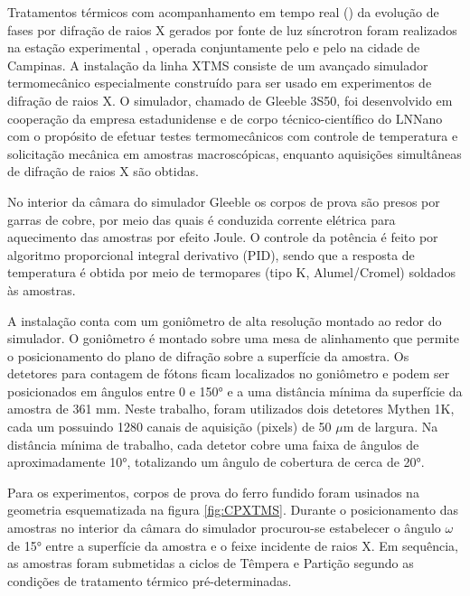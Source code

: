 Tratamentos térmicos com acompanhamento em tempo real () da evolução de fases por difração de raios X gerados por fonte de luz síncrotron foram realizados na estação experimental , operada conjuntamente pelo   e pelo  na cidade de Campinas. A instalação da linha XTMS consiste de um avançado simulador termomecânico especialmente construído para ser usado em experimentos de difração de raios X. O simulador, chamado de Gleeble\textregistered{} 3S50, foi desenvolvido em cooperação da empresa estadunidense  e de corpo técnico-científico do LNNano com o propósito de efetuar testes termomecânicos com controle de temperatura e solicitação mecânica em amostras macroscópicas, enquanto aquisições simultâneas de difração de raios X são obtidas. %

No interior da câmara do simulador Gleeble os corpos de prova são presos por garras de cobre, por meio das quais é conduzida corrente elétrica para aquecimento das amostras por efeito Joule. O controle da potência é feito por algoritmo proporcional integral derivativo (PID), sendo que a resposta de temperatura é obtida por meio de termopares (tipo K, Alumel/Cromel) soldados às amostras.

A instalação conta com um goniômetro de alta resolução montado ao redor do simulador. O goniômetro é montado sobre uma mesa de alinhamento que permite o posicionamento do plano de difração sobre a superfície da amostra. Os detetores para contagem de fótons ficam localizados no goniômetro e podem ser posicionados em ângulos entre 0 e 150° e a uma distância mínima da superfície da amostra de 361 mm. Neste trabalho, foram utilizados dois detetores Mythen 1K, cada um possuindo 1280 canais de aquisição (pixels) de 50 $\mu$m de largura. Na distância mínima de trabalho, cada detetor cobre uma faixa de ângulos de aproximadamente 10°, totalizando um ângulo de cobertura de cerca de 20°.

Para os experimentos, corpos de prova do ferro fundido foram usinados na geometria esquematizada na figura \ref{fig:CPXTMS}. Durante o posicionamento das amostras no interior da câmara do simulador procurou-se estabelecer o ângulo $\omega$ de 15° entre a superfície da amostra e o feixe incidente de raios X. Em sequência, as amostras foram submetidas a ciclos de Têmpera e Partição segundo as condições de tratamento térmico pré-determinadas.

